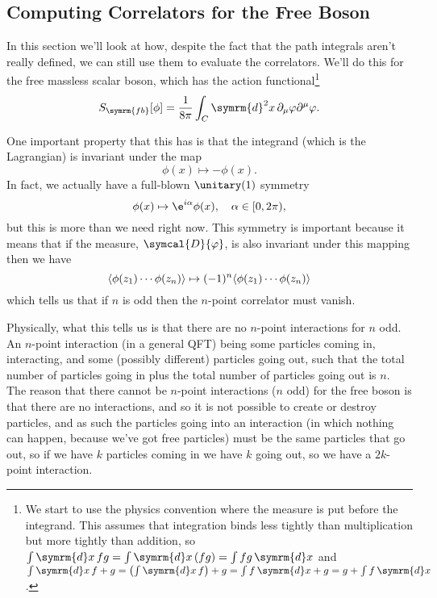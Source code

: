 \documentclass[fleqn]{NotesClass}
\renewcommand{\dd}[1]{\,\symrm{d}#1}
\renewcommand{\dl}[1]{\symrm{d}#1}
\newcommand{\DL}{\symcal{D}}
\DeclarePairedDelimiter{\correlator}{\langle}{\rangle}
\newcommand{\freeboson}{\symrm{fb}}
\begin{document}
    \subsection{Computing Correlators for the Free Boson}
    In this section we'll look at how, despite the fact that the path integrals aren't really defined, we can still use them to evaluate the correlators.
    We'll do this for the free massless scalar boson, which has the action functional\footnote{We start to use the physics convention where the measure is put before the integrand. This assumes that integration binds less tightly than multiplication but more tightly than addition, so \(\int \dl{x} \, fg = \int \dl{x} \, (fg) = \int fg \dd{x}\) and \(\int \dl{x} \, f + g = \left( \int \dl{x} \, f \right) + g = \int f \dd{x} + g = g + \int f \dd{x}\).}
    \begin{equation}
        S_{\freeboson}[\phi] = \frac{1}{8\pi} \int_C \dl{^2x} \, \partial_\mu \varphi \partial^\mu \varphi.
    \end{equation}
    
    One important property that this has is that the integrand (which is the Lagrangian) is invariant under the map
    \begin{equation}
        \phi(x) \mapsto -\phi(x).
    \end{equation}
    In fact, we actually have a full-blown \(\unitary(1)\) symmetry
    \begin{equation}
        \phi(x) \mapsto \e^{i\alpha}\phi(x), \quad \alpha \in [0, 2\pi),
    \end{equation}
    but this is more than we need right now.
    This symmetry is important because it means that if the measure, \(\DL{\varphi}\), is also invariant under this mapping then we have
    \begin{equation}
        \correlator{\phi(z_1) \dotsm \phi(z_n)} \mapsto (-1)^n \correlator{\phi(z_1) \dotsm \phi(z_n)}
    \end{equation}
    which tells us that if \(n\) is odd then the \(n\)-point correlator must vanish.
    
    Physically, what this tells us is that there are no \(n\)-point interactions for \(n\) odd.
    An \(n\)-point interaction (in a general QFT) being some particles coming in, interacting, and some (possibly different) particles going out, such that the total number of particles going in plus the total number of particles going out is \(n\).
    The reason that there cannot be \(n\)-point interactions (\(n\) odd) for the free boson is that there are no interactions, and so it is not possible to create or destroy particles, and as such the particles going into an interaction (in which nothing can happen, because we've got free particles) must be the same particles that go out, so if we have \(k\) particles coming in we have \(k\) going out, so we have a \(2k\)-point interaction.
    
\end{document}

